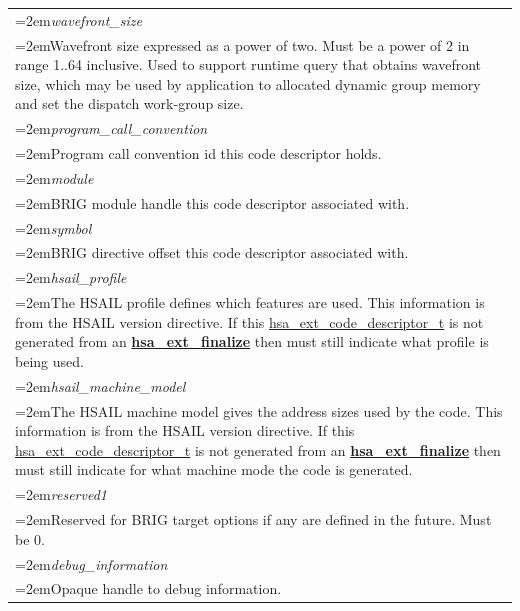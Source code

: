 \documentclass[final]{book}
\newcommand{\reffun}[1]{\textbf{#1}}
\newcommand{\reffld}[1]{\textit{#1}}
\begin{document}
\begin{longtable}{@{}>{\hangindent=2em}p{\textwidth}}
\reffld{wavefront_size}\\\hspace{2em}Wavefront size expressed as a power of two. Must be a power of 2 in range 1..64 inclusive. Used to support runtime query that obtains wavefront size, which may be used by application to allocated dynamic group memory and set the dispatch work-group size.\\[2mm]
\reffld{program_call_convention}\\\hspace{2em}Program call convention id this code descriptor holds.\\[2mm]
\reffld{module}\\\hspace{2em}BRIG module handle this code descriptor associated with.\\[2mm]
\reffld{symbol}\\\hspace{2em}BRIG directive offset this code descriptor associated with.\\[2mm]
\reffld{hsail_profile}\\\hspace{2em}The HSAIL profile defines which features are used. This information is from the HSAIL version directive. If this \hyperlink{group__FinalizerCoreApi_1ga0e01eabc57d7105ea37e1abbb50fa337}{hsa_ext_code_descriptor_t} is not generated from an \hyperlink{group__FinalizerCoreApi_1gad42cf738ed29770a7cec53fc13009a93}{\reffun{hsa_ext_finalize}} then must still indicate what profile is being used.\\[2mm]
\reffld{hsail_machine_model}\\\hspace{2em}The HSAIL machine model gives the address sizes used by the code. This information is from the HSAIL version directive. If this \hyperlink{group__FinalizerCoreApi_1ga0e01eabc57d7105ea37e1abbb50fa337}{hsa_ext_code_descriptor_t} is not generated from an \hyperlink{group__FinalizerCoreApi_1gad42cf738ed29770a7cec53fc13009a93}{\reffun{hsa_ext_finalize}} then must still indicate for what machine mode the code is generated.\\[2mm]
\reffld{reserved1}\\\hspace{2em}Reserved for BRIG target options if any are defined in the future. Must be 0.\\[2mm]
\reffld{debug_information}\\\hspace{2em}Opaque handle to debug information.\\[2mm]

\end{longtable}
\end{document}
